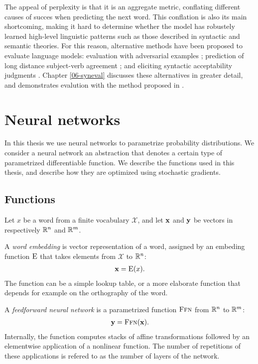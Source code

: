    The appeal of perplexity is that it is an aggregate metric, conflating different causes of succes when predicting the next word. This conflation is also its main shortcoming, making it hard to determine whether the model has robustely learned high-level linguistic patterns such as those described in syntactic and semantic theories. For this reason, alternative methods have been proposed to evaluate language models: evaluation with adversarial examples \citep{smith2012adversarial}; prediction of long distance subject-verb agreement \citep{linzen2016syntax}; and eliciting syntactic acceptability judgments \citep{linzen2018targeted}. Chapter \ref{06-syneval} discusses these alternatives in greater detail, and demonstrates evalution with the method proposed in \citep{linzen2018targeted}.


\section{Neural networks}

  In this thesis we use neural networks to parametrize probability distributions. We consider a neural network an abstraction that denotes a certain type of parametrized differentiable function. We describe the functions used in this thesis, and describe how they are optimized using stochastic gradients.

  \subsection{Functions}
    Let $x$ be a word from a finite vocabulary $\mathcal{X}$, and let $\mathbf{x}$ and $\mathbf{y}$ be vectors in respectively $\mathbb{R}^{n}$ and $\mathbb{R}^{m}$.

    \begin{definition}{} A \textit{word embedding} is vector representation of a word, assigned by an embeding function $\textsc{E}$ that takes elements from $\mathcal{X}$ to $\mathbb{R}^{n}$:
    \begin{align*}
      \mathbf{x} = \textsc{E}( x ).
    \end{align*}
    The function can be a simple lookup table, or a more elaborate function that depends for example on the orthography of the word.
    \end{definition}

    \begin{definition}{} A \textit{feedforward neural network} is a parametrized function $\textsc{Ffn}$ from $\mathbb{R}^{n}$ to $\mathbb{R}^{m}$:
    \begin{align*}
      \mathbf{y} = \textsc{Ffn}( \mathbf{x} ).
    \end{align*}
    Internally, the function computes stacks of affine transformations followed by an elementwise application of a nonlinear function. The number of repetitions of these applications is refered to as the number of layers of the network.
    \end{definition}

